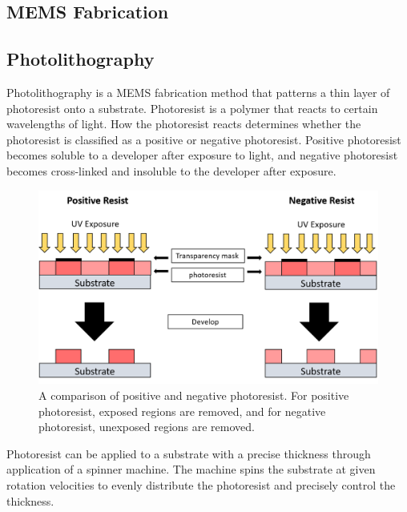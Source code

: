  \subsection{MEMS Fabrication}
 
 \subsection*{Photolithography}
 
 \par Photolithography is a MEMS fabrication method that patterns a thin layer of photoresist onto a substrate. Photoresist is a polymer that reacts to certain wavelengths of light. How the photoresist reacts determines whether the photoresist is classified as a positive or negative photoresist. Positive photoresist becomes soluble to a developer after exposure to light, and negative photoresist becomes cross-linked and insoluble to the developer after exposure. 
 
 \begin{figure}[h]
     \centering
     \includegraphics[width=\textwidth]{images/negative_vs_positive_resist.png}
     \caption[A comparison of positive and negative photoresist]{A comparison of positive and negative photoresist. For positive photoresist, exposed regions are removed, and for negative photoresist, unexposed regions are removed.}
     \label{fig:negative_vs_positive_resist}
 \end{figure}
 
 \par Photoresist can be applied to a substrate with a precise thickness through application of a spinner machine. The machine spins the substrate at given rotation velocities to evenly distribute the photoresist and precisely control the thickness. 
 

